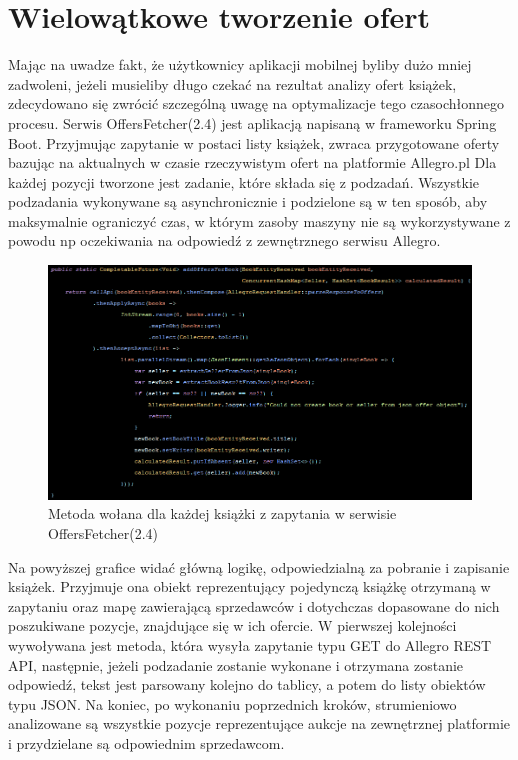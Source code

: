 
\section{Wielowątkowe tworzenie ofert}
Mając na uwadze fakt, że użytkownicy aplikacji mobilnej byliby dużo mniej zadwoleni, jeżeli musieliby długo czekać na rezultat analizy ofert książek, zdecydowano się zwrócić szczególną uwagę na optymalizacje tego czasochłonnego procesu.
Serwis OffersFetcher(2.4) jest aplikacją napisaną w frameworku Spring Boot. Przyjmując zapytanie w postaci listy książek, zwraca przygotowane oferty bazując na aktualnych w czasie rzeczywistym ofert na platformie Allegro.pl
Dla każdej pozycji tworzone jest zadanie, które składa się z podzadań. Wszystkie podzadania wykonywane są asynchronicznie i podzielone są w ten sposób, aby maksymalnie ograniczyć czas, w którym zasoby maszyny nie są wykorzystywane z powodu np oczekiwania na odpowiedź z zewnętrznego serwisu Allegro.
\begin{figure}[H]
	\centering
	\includegraphics[width=\linewidth]{tasks.png}
	\caption{Metoda wołana dla każdej książki z zapytania w serwisie OffersFetcher(2.4)}
\end{figure}
Na powyższej grafice widać główną logikę, odpowiedzialną za pobranie i zapisanie książek. Przyjmuje ona obiekt reprezentujący pojedynczą książkę otrzymaną w zapytaniu oraz mapę zawierającą sprzedawców i dotychczas dopasowane do nich poszukiwane pozycje, znajdujące się w ich ofercie.
W pierwszej kolejności wywoływana jest metoda, która wysyła zapytanie typu GET do Allegro REST API, następnie, jeżeli podzadanie zostanie wykonane i  otrzymana zostanie odpowiedź, tekst jest parsowany kolejno do tablicy, a potem do listy obiektów typu JSON.
Na koniec, po wykonaniu poprzednich kroków, strumieniowo analizowane są wszystkie pozycje reprezentujące aukcje na zewnętrznej platformie i przydzielane są odpowiednim sprzedawcom.


